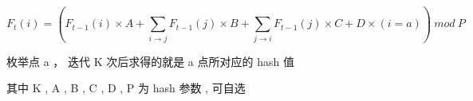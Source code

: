 
$$F_t(i) = 
    (F_{t-1}(i) \times A + 
    \sum_{i\rightarrow j} F_{t-1}(j) \times B + 
    \sum_{j\rightarrow i} F_{t-1}(j) \times C +
    D \times (i = a))\ mod\ P
$$

枚举点 a ， 迭代 K 次后求得的就是 a 点所对应的 hash 值 

其中 K , A , B , C , D , P 为 hash 参数 , 可自选
